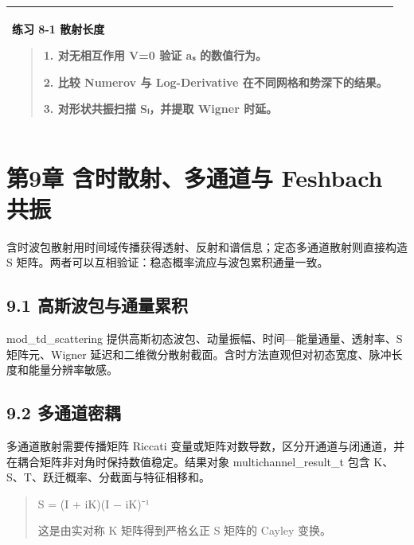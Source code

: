 \documentclass[UTF8,openany,11pt,fontset=fandol]{ctexbook}
\begin{document}
\begin{longtable}[]{@{}l@{}}
\toprule
\endhead
\begin{minipage}[t]{0.97\columnwidth}\raggedright
\textbf{练习 8-1 散射长度}

\begin{quote}
1. 对无相互作用 V=0 验证 aₛ 的数值行为。

2. 比较 Numerov 与 Log-Derivative 在不同网格和势深下的结果。

3. 对形状共振扫描 Sₗ，并提取 Wigner 时延。
\end{quote}\strut
\end{minipage}\tabularnewline
\bottomrule
\end{longtable}

\chapter{第9章 含时散射、多通道与 Feshbach 共振}\label{ux7b2c9ux7ae0-ux542bux65f6ux6563ux5c04ux591aux901aux9053ux4e0e-feshbach-ux5171ux632f}

含时波包散射用时间域传播获得透射、反射和谱信息；定态多通道散射则直接构造
S 矩阵。两者可以互相验证：稳态概率流应与波包累积通量一致。

\section{\texorpdfstring{\textbf{9.1
高斯波包与通量累积}}{9.1 高斯波包与通量累积}}\label{ux9ad8ux65afux6ce2ux5305ux4e0eux901aux91cfux7d2fux79ef}

mod\_td\_scattering
提供高斯初态波包、动量振幅、时间---能量通量、透射率、S 矩阵元、Wigner
延迟和二维微分散射截面。含时方法直观但对初态宽度、脉冲长度和能量分辨率敏感。

\section{\texorpdfstring{\textbf{9.2
多通道密耦}}{9.2 多通道密耦}}\label{ux591aux901aux9053ux5bc6ux8026}

多通道散射需要传播矩阵 Riccati
变量或矩阵对数导数，区分开通道与闭通道，并在耦合矩阵非对角时保持数值稳定。结果对象
multichannel\_result\_t 包含 K、S、T、跃迁概率、分截面与特征相移和。

\begin{quote}
S = (I + iK)(I − iK)⁻¹

这是由实对称 K 矩阵得到严格幺正 S 矩阵的 Cayley 变换。
\end{quote}
\end{document}
